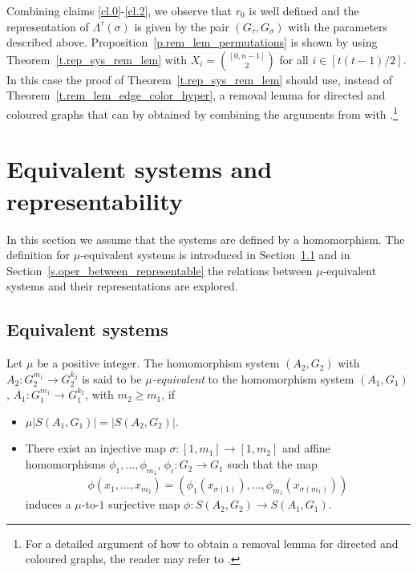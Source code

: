 \documentclass[10pt]{article}
\begin{document}
Combining claims \ref{cl.0}-\ref{cl.2}, we observe that $r_0$ is well defined and the representation of $\Lambda^{\tau}(\sigma)$ is given by the pair $(G_{\tau},G_{\sigma})$ with the parameters described above.
Proposition~\ref{p.rem_lem_permutations} is shown by using
Theorem~\ref{t.rep_sys_rem_lem} with $X_i={[0,n-1] \choose 2}$ for all $i\in [t(t-1)/2]$. In this case the proof of Theorem~\ref{t.rep_sys_rem_lem} should use, instead of Theorem~\ref{t.rem_lem_edge_color_hyper}, a removal lemma for directed and coloured graphs that can by obtained by combining the arguments from \cite[Lemma~4.1]{alosha04} with \cite[Theorem~1.18]{komsim96}.\footnote{For a detailed argument of how to obtain a removal lemma for directed and coloured graphs, the reader may refer to \cite{vena_master}.}



\section{Equivalent systems and representability} \label{s.equiv_and_rep}

In this section we assume that the systems are defined by a homomorphism. The definition for $\mu$-equivalent systems is introduced in Section~\ref{s.equiv_systems} and in Section~\ref{s.oper_between_representable} the relations between $\mu$-equivalent systems and their representations are explored.


\subsection{Equivalent systems} \label{s.equiv_systems}


Let $\mu$ be a positive integer. The homomorphism system $(A_2,G_2)$ with $A_2:G_2^{m_1}\to G_2^{k_2}$ is said to be \emph{$\mu$-equivalent} to the homomorphism system $(A_1,G_1)$, $A_1:G_1^{m_1}\to G_1^{k_2}$, with $m_2\geq m_1$, if 
\begin{itemize}
	\item $\mu |S(A_1,G_1)|=|S(A_2,G_2)|$.
	\item There exist an injective map $\sigma: [1,m_1] \to [1,m_2]$ and affine homomorphisms $\phi_1,\ldots,\phi_{m_1}$, $\phi_i: G_2\to G_1$ such that the  map
	\begin{displaymath}
		\phi(x_1,\ldots,x_{m_2})=\left(\phi_1(x_{\sigma(1)}),\ldots,\phi_{m_1}(x_{\sigma(m_1)})\right)
		\end{displaymath}
induces a $\mu$-to-$1$ surjective map $\phi: S(A_2,G_2) \to S(A_1,G_1)$. 
\end{itemize}
\end{document}
